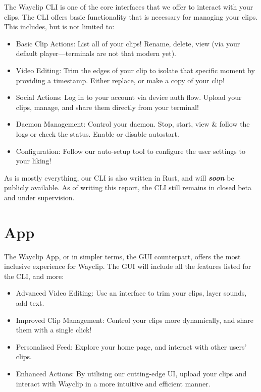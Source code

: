 The Wayclip CLI is one of the core interfaces that we offer to interact with your clips. The CLI offers basic functionality that is necessary for managing your clips. This includes, but is not limited to:
\begin{itemize}
	\item Basic Clip Actions: List all of your clips! Rename, delete, view (via your default player---terminals are not that modern yet).
	\item Video Editing: Trim the edges of your clip to isolate that specific moment by providing a timestamp. Either replace, or make a copy of your clip!
	\item Social Actions: Log in to your account via device auth flow. Upload your clips, manage, and share them directly from your terminal!
	\item Daemon Management: Control your daemon. Stop, start, view \& follow the logs or check the status. Enable or disable autostart.
	\item Configuration: Follow our auto-setup tool to configure the user settings to your liking!
\end{itemize}

As is mostly everything, our CLI is also written in Rust, and will \emph{\textbf{soon}} be publicly available. As of writing this report, the CLI still remains in closed beta and under supervision.

\section{App}

The Wayclip App, or in simpler terms, the GUI counterpart, offers the most inclusive experience for Wayclip. The GUI will include all the features listed for the CLI, and more:

\begin{itemize}
	\item Advanced Video Editing: Use an interface to trim your clips, layer sounds, add text.
	\item Improved Clip Management: Control your clips more dynamically, and share them with a single click!
	\item Personalised Feed: Explore your home page, and interact with other users' clips.
	\item Enhanced Actions: By utilising our cutting-edge UI, upload your clips and interact with Wayclip in a more intuitive and efficient manner.
\end{itemize}

